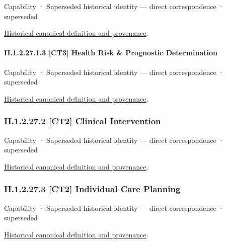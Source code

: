 \label{element:e575c583783546ef85cf898523d18797}
{\small Capability · Superseded historical identity — direct correspondence · superseded}\par
\href{../../../../continuum/strategy/capability/e575c583783546ef85cf898523d18797.md}{Historical canonical definition and provenance}.\par
\paragraph*{II.1.2.27.1.3 [CT3] Health Risk \& Prognostic Determination}
\label{navigation:II.1.2.27.1.3}

\label{element:3215f0b0e1ce45e8ab16dae272ea6fe7}
{\small Capability · Superseded historical identity — direct correspondence · superseded}\par
\href{../../../../continuum/strategy/capability/3215f0b0e1ce45e8ab16dae272ea6fe7.md}{Historical canonical definition and provenance}.\par
\subsubsection*{II.1.2.27.2 [CT2] Clinical Intervention}
\label{navigation:II.1.2.27.2}

\label{element:958345ee65f446d3b1259b8895ab100f}
{\small Capability · Superseded historical identity — direct correspondence · superseded}\par
\href{../../../../continuum/strategy/capability/958345ee65f446d3b1259b8895ab100f.md}{Historical canonical definition and provenance}.\par
\subsubsection*{II.1.2.27.3 [CT2] Individual Care Planning}
\label{navigation:II.1.2.27.3}

\label{element:574e61e230e643f78c58649adb4db313}
{\small Capability · Superseded historical identity — direct correspondence · superseded}\par
\href{../../../../continuum/strategy/capability/574e61e230e643f78c58649adb4db313.md}{Historical canonical definition and provenance}.\par
